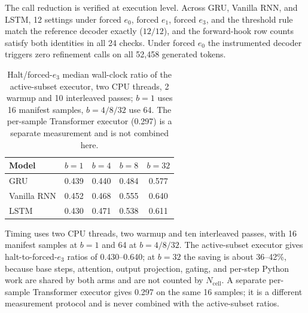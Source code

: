 \documentclass[11pt]{article}
\begin{document}
The call reduction is verified at execution level. Across GRU, Vanilla RNN, and LSTM, 12 settings under forced $e_0$, forced $e_1$, forced $e_3$, and the threshold rule match the reference decoder exactly ($12/12$), and the forward-hook row counts satisfy both identities in all 24 checks. Under forced $e_0$ the instrumented decoder triggers zero refinement calls on all 52{,}458 generated tokens. \begin{table}[t]
\centering
\begin{tabular}{lcccc}
\toprule
Model & $b{=}1$ & $b{=}4$ & $b{=}8$ & $b{=}32$ \\
\midrule
GRU & 0.439 & 0.440 & 0.484 & 0.577 \\
Vanilla RNN & 0.452 & 0.468 & 0.555 & 0.640 \\
LSTM & 0.430 & 0.471 & 0.538 & 0.611 \\
\bottomrule
\end{tabular}
\caption{Halt/forced-$e_3$ median wall-clock ratio of the active-subset executor, two CPU threads, 2 warmup and 10 interleaved passes; $b{=}1$ uses 16 manifest samples, $b{=}4/8/32$ use 64. The per-sample Transformer executor (0.297) is a separate measurement and is not combined here.}
\label{tab:wall}
\end{table} Timing uses two CPU threads, two warmup and ten interleaved passes, with 16 manifest samples at $b{=}1$ and 64 at $b{=}4/8/32$. The active-subset executor gives halt-to-forced-$e_3$ ratios of 0.430--0.640; at $b{=}32$ the saving is about 36--42\%, because base steps, attention, output projection, gating, and per-step Python work are shared by both arms and are not counted by $N_{\mathrm{cell}}$. A separate per-sample Transformer executor gives 0.297 on the same 16 samples; it is a different measurement protocol and is never combined with the active-subset ratios.
\end{document}
